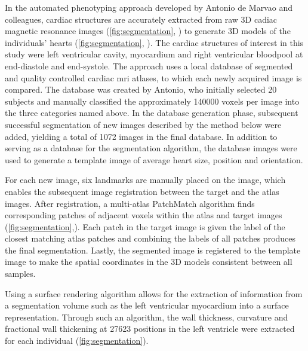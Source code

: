 In the automated phenotyping approach developed by Antonio de Marvao and colleagues, cardiac structures are accurately extracted from raw 3D cadiac magnetic resonance images (\cref{fig:segmentation}, ) to generate 3D models of the individuals' hearts  (\cref{fig:segmentation}, ). The cardiac structures of interest in this study were left ventricular cavity, myocardium and right ventricular bloodpool at end-diastole and end-systole. The approach uses a local database of segmented and quality controlled cardiac \gls{mri} atlases, to which each newly acquired image is compared. The database was created by Antonio, who initially selected \num{20} subjects and manually classified the approximately \num{140000} voxels per image into the three categories named above. In the database generation phase, subsequent successful segmentation of new images described by the method below were added, yielding a total of \num{1072} images in the final database. In addition to serving as a database for the segmentation algorithm, the database images were used to generate a template image of average heart size, position and orientation. 

For each new image, six landmarks are manually placed on the image, which enables the subsequent image registration between the target and the atlas images. After registration, a multi-atlas PatchMatch algorithm finds corresponding patches of adjacent voxels within the atlas and target images (\cref{fig:segmentation},). Each patch in the target image is given the label of the closest matching atlas patches and combining the labels of all patches produces the final segmentation. Lastly, the segmented image is registered to the template image to make the spatial coordinates in the 3D models consistent between all samples.  

Using a surface rendering algorithm allows for the extraction of information from a segmentation volume such as the left ventricular myocardium into a surface representation. Through such an algorithm, the wall thickness, curvature and  fractional wall thickening at \num{27623} positions in the left ventricle were extracted for each individual (\cref{fig:segmentation}). %
\\

